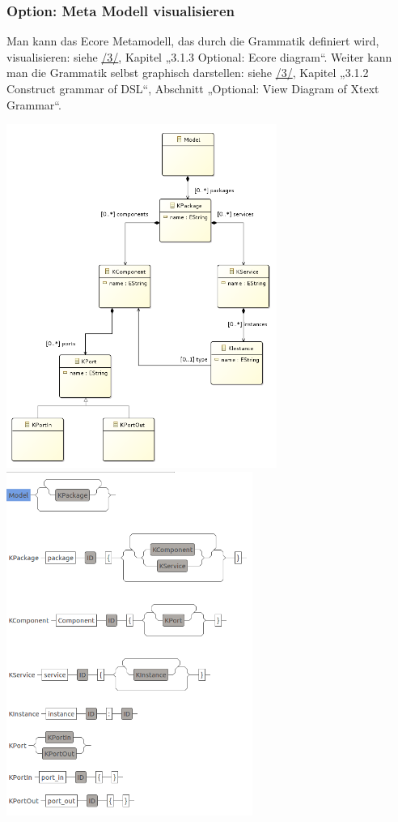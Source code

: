 \documentclass[a4]{article}
\begin{document}
\subsubsection{Option: Meta Modell
visualisieren}\label{option-meta-modell-visualisieren}

Man kann das Ecore Metamodell, das durch die Grammatik definiert wird,
visualisieren: siehe \protect\hyperlink{anchor-3}{/3/}, Kapitel „3.1.3
Optional: Ecore diagram``. Weiter kann man die Grammatik selbst
graphisch darstellen: siehe \protect\hyperlink{anchor-3}{/3/}, Kapitel
„3.1.2 Construct grammar of DSL``, Abschnitt „Optional: View Diagram of
Xtext Grammar``.

\includegraphics[width=3.48070in,height=4.41890in]{./Pictures/10000201000002670000030DFC51453B7F2AE519.png}\includegraphics[width=3.16730in,height=4.41340in]{./Pictures/1000020100000220000002F6794AA4A4B50FC707.png}
\end{document}
